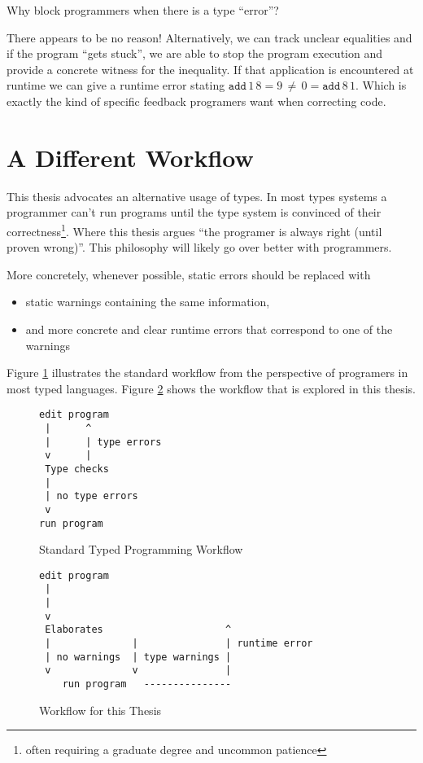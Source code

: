 Why block programmers when there is a type ``error''? 

There appears to be no reason! Alternatively, we can track unclear equalities and if the program ``gets stuck'', we are able to stop the program execution and provide a concrete witness for the inequality.
If that application is encountered at runtime we can give a runtime error stating $\mathtt{add}\,1\,8=9\,\neq\,0=\mathtt{add}\,8\,1$.
Which is exactly the kind of specific feedback programers want when correcting code.

\section{A Different Workflow}

This thesis advocates an alternative usage of types. In most types systems a programmer can't run programs until the type system is convinced of their correctness\footnote{
  often requiring a graduate degree and uncommon patience}.
Where this thesis argues ``the programer is always right (until proven wrong)''.
This philosophy will likely go over better with programmers.

More concretely, whenever possible, static errors should be replaced with 
\begin{itemize}
\item static warnings containing the same information, 
\item and more concrete and clear runtime errors that correspond to one of the warnings
\end{itemize}
Figure \ref{fig:intro-standard-workflow} illustrates the standard workflow from the perspective of programers in most typed languages.
Figure \ref{fig:intro-thesis-workflow} shows the workflow that is explored in this thesis. 

\begin{figure}
\begin{lstlisting}
edit program
 |      ^
 |      | type errors
 v      |
 Type checks
 |
 | no type errors
 v
run program
\end{lstlisting}


\caption{Standard Typed Programming Workflow}
\label{fig:intro-standard-workflow}
\end{figure}

\begin{figure}
\begin{lstlisting}
edit program
 |      
 |      
 v
 Elaborates                     ^
 |              |               | runtime error
 | no warnings  | type warnings |
 v              v               |
    run program   ---------------
\end{lstlisting}


\caption{Workflow for this Thesis}
\label{fig:intro-thesis-workflow}
\end{figure}

